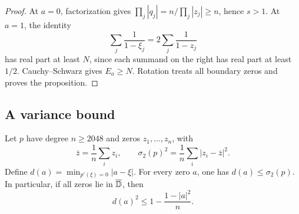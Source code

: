 \begin{proof}
At $a=0$, factorization gives
$\prod_j|q_j|=n/\prod_j|z_j|\ge n$, hence $s>1$.
At $a=1$, the identity
\[
 \sum_j\frac1{1-\xi_j}=2\sum_j\frac1{1-z_j}
\]
has real part at least $N$, since each summand on the right has real
part at least $1/2$. Cauchy--Schwarz gives $E_a\ge N$.
Rotation treats all boundary zeros and proves the proposition.
\end{proof}

\subsection{A variance bound}

\begin{proposition}\label{ar:variance}
Let $p$ have degree $n\ge2048$ and zeros $z_1,\ldots,z_n$, with
\[
 \bar z=\frac1n\sum_i z_i,\qquad
 \sigma_2(p)^2=\frac1n\sum_i|z_i-\bar z|^2.
\]
Define $d(a)=\min_{p'(\xi)=0}|a-\xi|$.
For every zero $a$, one has $d(a)\le\sigma_2(p)$.
In particular, if all zeros lie in $\overline{\mathbb D}$, then
\begin{equation}\label{ar:variance-unit}
 d(a)^2\le1-\frac{1-|a|^2}{n}.
\end{equation}
\end{proposition}


